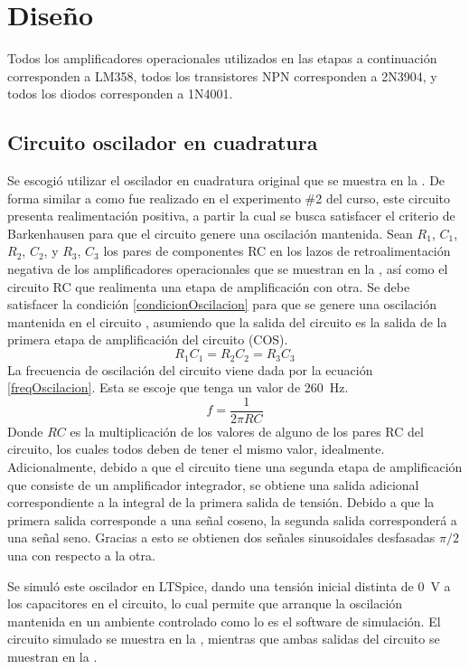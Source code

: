 \section{Diseño}
Todos los amplificadores operacionales utilizados en las etapas a continuación corresponden a LM358, todos los transistores NPN corresponden a 2N3904, y todos los diodos corresponden a 1N4001.
\subsection{Circuito oscilador en cuadratura}
Se escogió utilizar el oscilador en cuadratura original que se muestra en la .
De forma similar a como fue realizado en el experimento \#2 del curso, este circuito presenta realimentación positiva, a partir la cual se busca satisfacer el criterio de Barkenhausen para que el circuito genere una oscilación mantenida. 
Sean $R_1$, $C_1$, $R_2$, $C_2$, y $R_3$, $C_3$ los pares de componentes RC en los lazos de retroalimentación negativa de los amplificadores operacionales que se muestran en la , así como el circuito RC que realimenta una etapa de amplificación con otra. 
Se debe satisfacer la condición \eqref{condicionOscilacion} para que se genere una oscilación mantenida en el circuito \cite{franco2015opamps}, asumiendo que la salida del circuito es la salida de la primera etapa de amplificación del circuito (COS).
\begin{equation}
    R_1 C_1 = R_2 C_2 = R_3 C_3\label{condicionOscilacion}
\end{equation}
La frecuencia de oscilación del circuito viene dada por la ecuación \eqref{freqOscilacion}.
Esta se escoje que tenga un valor de \SI{260}{Hz}.
\begin{equation}
    f = \frac{1}{2\pi RC}\label{freqOscilacion}
\end{equation}
Donde $RC$ es la multiplicación de los valores de alguno de los pares RC del circuito, los cuales todos deben de tener el mismo valor, idealmente.
Adicionalmente, debido a que el circuito tiene una segunda etapa de amplificación que consiste de un amplificador integrador, se obtiene una salida adicional correspondiente a la integral de la primera salida de tensión. 
Debido a que la primera salida corresponde a una señal coseno, la segunda salida corresponderá a una señal seno.
Gracias a esto se obtienen dos señales sinusoidales desfasadas $\pi/2$ una con respecto a la otra.

Se simuló este oscilador en LTSpice, dando una tensión inicial distinta de \SI{0}{V} a los capacitores en el circuito, lo cual permite que arranque la oscilación mantenida en un ambiente controlado como lo es el software de simulación.
El circuito simulado se muestra en la , mientras que ambas salidas del circuito se muestran en la .

